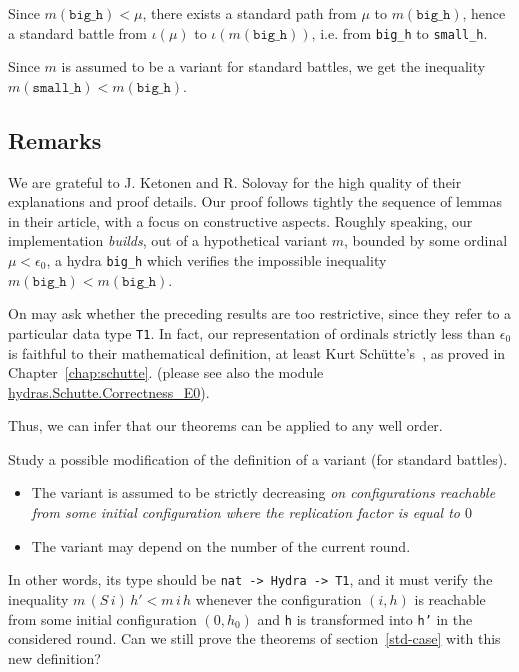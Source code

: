 Since $m(\texttt{big\_h})< \mu$, there exists a standard path from $\mu$ to
$m(\texttt{big\_h})$, hence a   standard battle from $\iota(\mu)$  to
$\iota(m(\texttt{big\_h}))$,  i.e. from \texttt{big\_h} to \texttt{small\_h}.

Since $m$ is assumed to be a variant for standard battles, we get the inequality  $m(\texttt{small\_h}) < m(\texttt{big\_h})$.







\subsection{Remarks}

We are grateful to 
 J. Ketonen and R. Solovay  for the high quality of their explanations and proof details.
Our proof follows tightly the sequence of lemmas in their article, with a focus on 
constructive aspects.
Roughly speaking, our implementation \emph{builds}, out of a hypothetical
  variant $m$, bounded by some ordinal $\mu<\epsilon_0$, a hydra \texttt{big\_h} which verifies the impossible inequality  $m(\texttt{big\_h})< m(\texttt{big\_h})$.



On may ask whether the preceding results are too restrictive, since they 
refer to a particular data type \texttt{T1}.
In fact, our representation of ordinals strictly less than 
 $\epsilon_0$ is faithful to their mathematical definition, at least 
Kurt Schütte's~\cite{schutte}, as proved in Chapter~\vref{chap:schutte}.
(please see also the module
\href{../theories/html/hydras.Schutte.Correctness_E0.html}{hydras.Schutte.Correctness\_E0}).

Thus, we can infer that our theorems can be applied to any well order.

\begin{project}
Study a possible modification of the definition of a variant  (for  standard battles).

\begin{itemize}
\item The variant is assumed to be strictly decreasing \emph{on configurations 
reachable from some initial configuration where the replication factor is equal to $0$}
\item The variant may depend on the number of the current round.
\end{itemize}

In other words, its type should be \texttt{nat -> Hydra -> T1}, and it must 
verify the inequality $m\, (S\,i)\, h' < m\,i\, h$ whenever the configuration 
$(i,h)$ is reachable from some initial configuration $(0,h_0)$
and \texttt{h} is transformed into \texttt{h'} in the considered round.
Can we still prove the theorems of section~\ref{std-case} with this new definition?

\end{project}


